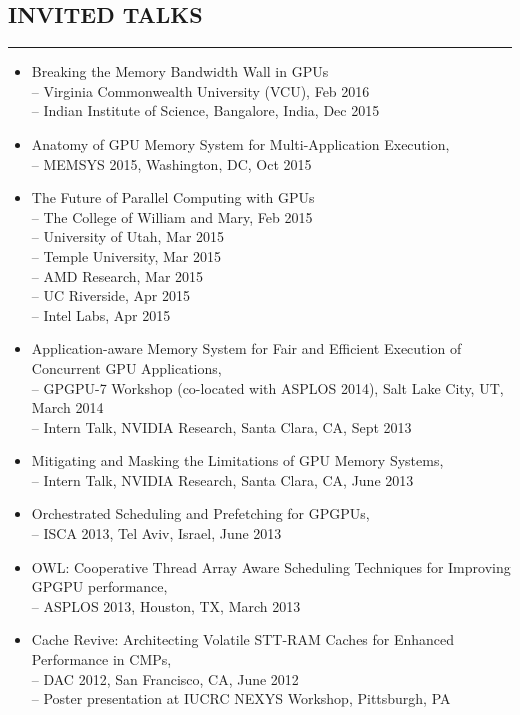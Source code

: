 \documentclass[10pt,a4]{article}
\begin{document}
\subsection*{INVITED TALKS}
\hrule
\vspace{0.2cm}
\begin{itemize}
\item Breaking the Memory Bandwidth Wall in GPUs  \\
-- Virginia Commonwealth University (VCU), Feb 2016 \\
-- Indian Institute of Science, Bangalore, India, Dec 2015

\item Anatomy of GPU Memory System for Multi-Application Execution, \\
-- MEMSYS 2015, Washington, DC, Oct 2015 

\item The Future of Parallel Computing with GPUs \\
-- The College of William and Mary, Feb 2015 \\
-- University of Utah, Mar 2015 \\
-- Temple University, Mar 2015 \\
-- AMD Research, Mar 2015 \\
-- UC Riverside, Apr 2015 \\
-- Intel Labs, Apr 2015 

\item Application-aware Memory System for Fair and Efficient Execution of Concurrent GPU Applications, \\
-- GPGPU-7 Workshop (co-located with ASPLOS 2014), Salt Lake City, UT, March 2014 \\
-- Intern Talk, NVIDIA Research, Santa Clara, CA, Sept 2013

\item Mitigating and Masking the Limitations of GPU Memory Systems, \\
-- Intern Talk, NVIDIA Research, Santa Clara, CA, June 2013

\item Orchestrated Scheduling and Prefetching for GPGPUs, \\
-- ISCA 2013, Tel Aviv, Israel, June 2013

\item OWL: Cooperative Thread Array Aware Scheduling Techniques for Improving GPGPU performance, \\
-- ASPLOS 2013, Houston, TX, March 2013 

\item Cache Revive: Architecting Volatile STT-RAM Caches for Enhanced Performance in CMPs, \\
-- DAC 2012, San Francisco, CA, June 2012\\
-- Poster presentation at IUCRC NEXYS Workshop, Pittsburgh, PA
\end{itemize}
\end{document}
